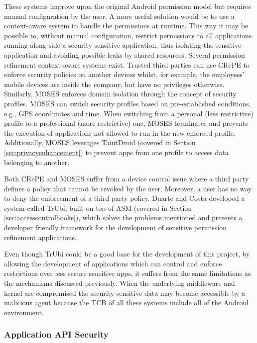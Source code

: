 These systems improve upon the original Android permission model but requires manual configuration by the user. A more useful solution would be to use a context-aware system to handle the permissions at runtime. This way it may be possible to, without manual configuration, restrict permissions to all applications running along side a security sensitive application, thus isolating the sensitive application and avoiding possible leaks by shared resources. Several permission refinement context-aware systems exist. Trusted third parties can use CRePE \cite{conti2011crepe} to enforce security policies on another devices whilst, for example, the employees' mobile devices are inside the company, but have no privileges otherwise. Similarly, MOSES \cite{russello2012moses} enforces domain isolation through the concept of security profiles. MOSES can switch security profiles based on pre-established conditions, e.g., GPS coordinates and time. When switching from a personal (less restrictive) profile to a professional (more restrictive) one, MOSES terminates and prevents the execution of applications not allowed to run in the new enforced profile. Additionally, MOSES leverages TaintDroid \cite{enck2014taintdroid} (covered in Section \ref{sec:privacyenhancement}) to prevent apps from one profile to access data belonging to another.

Both CRePE and MOSES suffer from a device control issue where a third party defines a policy that cannot be revoked by the user. Moreover, a user has no way to deny the enforcement of a third party policy. Duarte \cite{nunoduarte} and Costa \cite{miguelcosta} developed a system called TrUbi, built on top of ASM \cite{heuser2014asm} (covered in Section \ref{sec:accesscontrolhooks}), which solves the problems mentioned and presents a developer friendly framework for the development of sensitive permission refinement applications.

Even though TrUbi could be a good base for the development of this project, by allowing the development of applications which can control and enforce restrictions over less secure sensitive apps, it suffers from the same limitations as the mechanisms discussed previously. When the underlying middleware and kernel are compromised the security sensitive data may become accessible by a malicious agent because the \ac{TCB} of all these systems include all of the Android environment.

\subsubsection{Application API Security}


